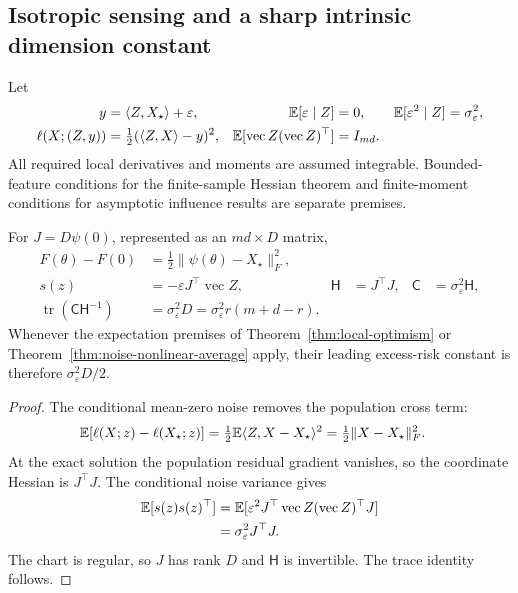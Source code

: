 \subsection{Isotropic sensing and a sharp intrinsic dimension constant}
\begin{definition}
Let
\begin{align}
y&=\langle Z,X_\star\rangle+\varepsilon,&
\mathbb E[\varepsilon\mid Z]&=0,&
\mathbb E[\varepsilon^2\mid Z]&=\sigma_\varepsilon^2,\\
\ell(X;(Z,y))&=\tfrac12(\langle Z,X\rangle-y)^2,&
\mathbb E[\operatorname{vec}Z(\operatorname{vec}Z)^\top]&=I_{md}.
\label{eq:local-isotropic-model}
\end{align}
All required local derivatives and moments are assumed integrable.
Bounded-feature conditions for the finite-sample Hessian theorem
and finite-moment conditions for asymptotic influence results are
separate premises.
\end{definition}

\begin{theorem}
\label{thm:local-isotropic-efficiency}
For $J=D\psi(0)$, represented as an $md\times D$ matrix,
\begin{align}
F(\theta)-F(0)
&=\tfrac12\|\psi(\theta)-X_\star\|_F^2,\\
s(z)&=-\varepsilon J^\top\operatorname{vec}Z,&
\mathsf H&=J^\top J,&
\mathsf C&=\sigma_\varepsilon^2\mathsf H,\\
\operatorname{tr}(\mathsf C\mathsf H^{-1})
&=\sigma_\varepsilon^2D
=\sigma_\varepsilon^2r(m+d-r).
\label{eq:local-intrinsic-efficiency}
\end{align}
Whenever the expectation premises of Theorem~\ref{thm:local-optimism}
or Theorem~\ref{thm:noise-nonlinear-average} apply, their leading
excess-risk constant is therefore $\sigma_\varepsilon^2D/2$.
\end{theorem}
\begin{proof}
The conditional mean-zero noise removes the population cross term:
\begin{align}
\mathbb E[\ell(X;z)-\ell(X_\star;z)]
&=\tfrac12\mathbb E\langle Z,X-X_\star\rangle^2
=\tfrac12\|X-X_\star\|_F^2 .
\end{align}
At the exact solution the population residual gradient vanishes,
so the coordinate Hessian is $J^\top J$. The conditional noise
variance gives
\begin{align}
\mathbb E[s(z)s(z)^\top]
&=\mathbb E[\varepsilon^2J^\top\operatorname{vec}Z
(\operatorname{vec}Z)^\top J]\\
&=\sigma_\varepsilon^2J^\top J .
\end{align}
The chart is regular, so $J$ has rank $D$ and $\mathsf H$ is
invertible. The trace identity follows.
\end{proof}

